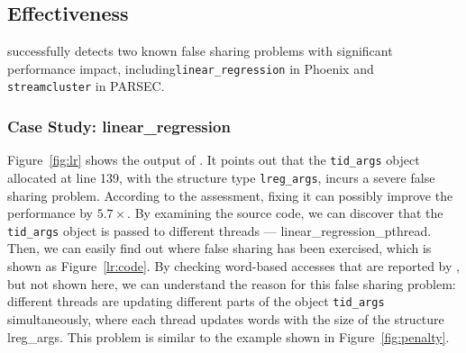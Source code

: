 
 
\subsection{Effectiveness}
\label{sec:effectiveness}

\cheetah{} successfully detects two known false sharing problems with significant performance impact, including\texttt{linear\_regression} in Phoenix and \texttt{streamcluster} in PARSEC. 



\subsubsection{Case Study: linear\_regression}
Figure~\ref{fig:lr} shows the output of \cheetah{}. It points out that the {\tt tid\_args} object allocated at line 139, with the structure type {\tt lreg\_args}, incurs a severe false sharing problem. According to the assessment, fixing it can possibly improve the performance by $5.7\times$. By examining the source code, we can discover that the {\tt tid\_args} object is passed to different threads --- linear\_regression\_pthread. Then, we can easily find out where false sharing has been exercised, which is shown as Figure~\ref{lr:code}. By checking word-based accesses that are reported by \cheetah{}, but not shown here, we can understand the reason for this false sharing problem: different threads are updating different parts of the object {\tt tid\_args} simultaneously, where each thread updates words with the size of the structure lreg\_args. This problem is similar to the example shown in Figure~\ref{fig:penalty}. 

